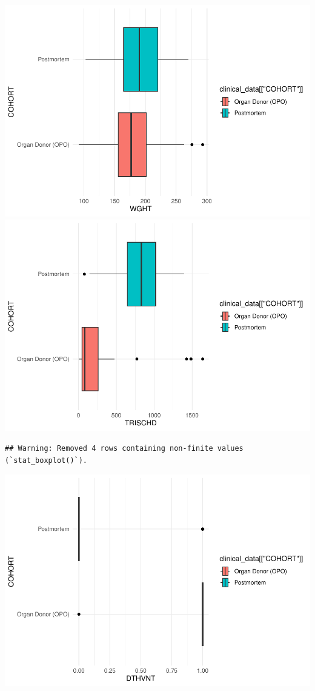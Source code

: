 \documentclass[
]{article}
\begin{document}
\includegraphics{Q1_markdown_files/figure-latex/unnamed-chunk-8-4.pdf}
\includegraphics{Q1_markdown_files/figure-latex/unnamed-chunk-8-5.pdf}

\begin{verbatim}
## Warning: Removed 4 rows containing non-finite values (`stat_boxplot()`).
\end{verbatim}

\includegraphics{Q1_markdown_files/figure-latex/unnamed-chunk-8-6.pdf}
\end{document}
